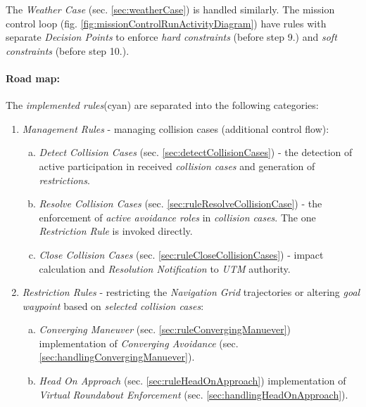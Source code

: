 \begin{note}
    The \emph{Weather Case} (sec. \ref{sec:weatherCase}) is handled similarly. The mission control loop (fig. \ref{fig:missionControlRunActivityDiagram}) have rules with separate \emph{Decision Points} to enforce \emph{hard constraints} (before step 9.) and \emph{soft constraints} (before step 10.).
\end{note}

\paragraph{Road map:} The \emph{implemented rules}(cyan) are separated into the following categories:
\begin{enumerate}
    \item \emph{Management Rules} - managing collision cases (additional control flow):
        \begin{enumerate}[a.]
            
            \item \emph{Detect Collision Cases} (sec. \ref{sec:detectCollisionCases}) - the detection of active participation in received \emph{collision cases} and generation of \emph{restrictions}.
            
            \item \emph{Resolve Collision Cases} (sec. \ref{sec:ruleResolveCollisionCase}) - the enforcement of \emph{active avoidance roles} in \emph{collision cases}. The one \emph{Restriction Rule} is invoked directly.
            
            \item \emph{Close Collision Cases} (sec. \ref{sec:ruleCloseCollisionCases}) - impact calculation and \emph{Resolution Notification} to \emph{UTM} authority.
        \end{enumerate}
    
    \item \emph{Restriction Rules} - restricting the \emph{Navigation Grid} trajectories or altering \emph{goal waypoint} based on \emph{selected collision cases}:
    \begin{enumerate}[a.]
        \item \emph{Converging Maneuver} (sec. \ref{sec:ruleConvergingManuever}) implementation of \emph{Converging Avoidance} (sec. \ref{sec:handlingConvergingManuever}).
        
        \item \emph{Head On Approach} (sec. \ref{sec:ruleHeadOnApproach}) implementation of \emph{Virtual Roundabout Enforcement} (sec. \ref{sec:handlingHeadOnApproach}).
        

\end{enumerate}
\end{enumerate}
